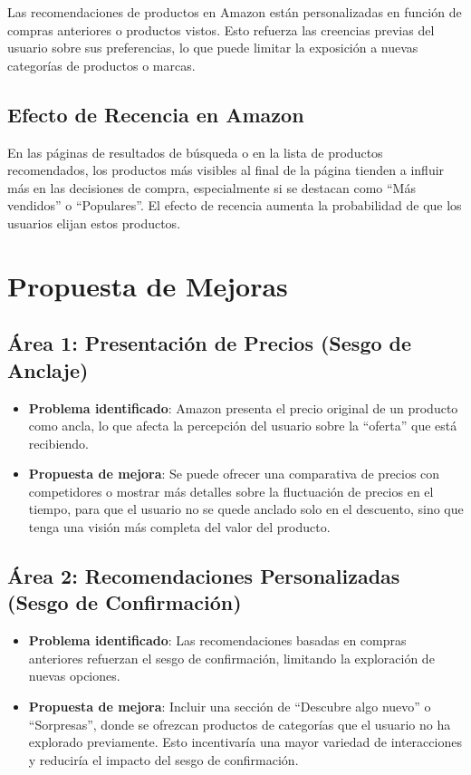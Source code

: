 	Las recomendaciones de productos en Amazon están personalizadas en función de
	compras anteriores o productos vistos. Esto refuerza las creencias previas del
	usuario sobre sus preferencias, lo que puede limitar la exposición a nuevas
	categorías de productos o marcas.

	\subsection{Efecto de Recencia en Amazon}

	En las páginas de resultados de búsqueda o en la lista de productos recomendados,
	los productos más visibles al final de la página tienden a influir más en las
	decisiones de compra, especialmente si se destacan como ``Más vendidos'' o ``Populares''.
	El efecto de recencia aumenta la probabilidad de que los usuarios elijan estos
	productos.

	\section{Propuesta de Mejoras}

	\subsection{Área 1: Presentación de Precios (Sesgo de Anclaje)}

	\begin{itemize}
		\item \textbf{Problema identificado}: Amazon presenta el precio original de un
			producto como ancla, lo que afecta la percepción del usuario sobre la ``oferta''
			que está recibiendo.

		\item \textbf{Propuesta de mejora}: Se puede ofrecer una comparativa de precios
			con competidores o mostrar más detalles sobre la fluctuación de precios en
			el tiempo, para que el usuario no se quede anclado solo en el descuento, sino
			que tenga una visión más completa del valor del producto.
	\end{itemize}

	\subsection{Área 2: Recomendaciones Personalizadas (Sesgo de Confirmación)}

	\begin{itemize}
		\item \textbf{Problema identificado}: Las recomendaciones basadas en compras
			anteriores refuerzan el sesgo de confirmación, limitando la exploración de
			nuevas opciones.

		\item \textbf{Propuesta de mejora}: Incluir una sección de ``Descubre algo nuevo''
			o ``Sorpresas'', donde se ofrezcan productos de categorías que el usuario
			no ha explorado previamente. Esto incentivaría una mayor variedad de interacciones
			y reduciría el impacto del sesgo de confirmación.
	\end{itemize}


